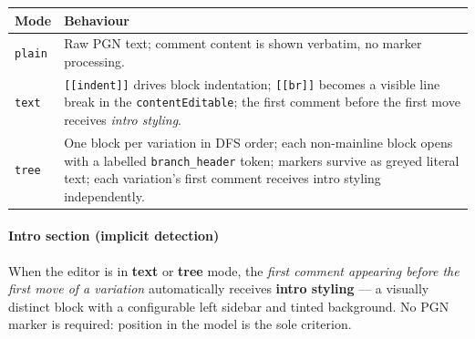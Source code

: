 \documentclass[]{article}
\let\oldparagraph\paragraph
\renewcommand{\paragraph}[1]{\oldparagraph{#1}\mbox{}}
\begin{document}
\begin{longtable}[]{@{}ll@{}}
\toprule
\begin{minipage}[b]{0.05\columnwidth}\raggedright\strut
Mode\strut
\end{minipage} & \begin{minipage}[b]{0.05\columnwidth}\raggedright\strut
Behaviour\strut
\end{minipage}\tabularnewline
\midrule
\endhead
\begin{minipage}[t]{0.05\columnwidth}\raggedright\strut
\texttt{plain}\strut
\end{minipage} & \begin{minipage}[t]{0.05\columnwidth}\raggedright\strut
Raw PGN text; comment content is shown verbatim, no marker
processing.\strut
\end{minipage}\tabularnewline
\begin{minipage}[t]{0.05\columnwidth}\raggedright\strut
\texttt{text}\strut
\end{minipage} & \begin{minipage}[t]{0.05\columnwidth}\raggedright\strut
\texttt{{[}{[}indent{]}{]}} drives block indentation;
\texttt{{[}{[}br{]}{]}} becomes a visible line break in the
\texttt{contentEditable}; the first comment before the first move
receives \emph{intro styling}.\strut
\end{minipage}\tabularnewline
\begin{minipage}[t]{0.05\columnwidth}\raggedright\strut
\texttt{tree}\strut
\end{minipage} & \begin{minipage}[t]{0.05\columnwidth}\raggedright\strut
One block per variation in DFS order; each non-mainline block opens with
a labelled \texttt{branch\_header} token; markers survive as greyed
literal text; each variation's first comment receives intro styling
independently.\strut
\end{minipage}\tabularnewline
\bottomrule
\end{longtable}

\paragraph{Intro section (implicit
detection)}\label{intro-section-implicit-detection}

When the editor is in \textbf{text} or \textbf{tree} mode, the
\emph{first comment appearing before the first move of a variation}
automatically receives \textbf{intro styling} --- a visually distinct
block with a configurable left sidebar and tinted background. No PGN
marker is required: position in the model is the sole criterion.
\end{document}
